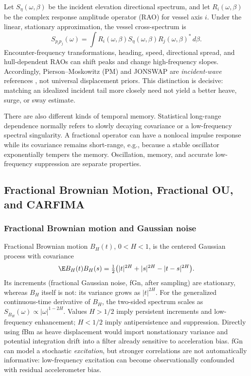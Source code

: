 Let \(S_\eta(\omega,\beta)\) be the incident elevation directional
spectrum, and let \(R_i(\omega,\beta)\) be the complex response amplitude
operator (RAO) for vessel axis \(i\). Under the linear, stationary
approximation, the vessel cross-spectrum is
\begin{equation}
S_{p_i p_j}(\omega)=\int
 R_i(\omega,\beta) S_\eta(\omega,\beta)
 R_j(\omega,\beta)^*\,d\beta.
\label{eq:frac-rao}
\end{equation}
Encounter-frequency transformations, heading, speed, directional spread,
and hull-dependent RAOs can shift peaks and change high-frequency slopes.
Accordingly, Pierson--Moskowitz (PM) and JONSWAP are \emph{incident-wave}
references \cite{pierson64,hasselmann73}, not universal displacement priors.
This distinction is decisive: matching an idealized incident tail more
closely need not yield a better heave, surge, or sway estimate.

There are also different kinds of temporal memory. Statistical
long-range dependence normally refers to slowly decaying covariance or a
low-frequency spectral singularity. A fractional operator can have a
nonlocal impulse response while its covariance remains short-range, e.g.,
because a stable oscillator exponentially tempers the memory. Oscillation,
memory, and accurate low-frequency suppression are separate properties.

\subsection{Fractional Brownian Motion, Fractional OU, and CARFIMA}
\label{sec:frac-processes}
\subsubsection{Fractional Brownian motion and Gaussian noise}
Fractional Brownian motion \(B_H(t)\), \(0<H<1\), is the centered Gaussian
process with covariance \cite{mandelbrot68}
\begin{equation}
\E B_H(t)B_H(s)=\tfrac12\bigl(
 |t|^{2H}+|s|^{2H}-|t-s|^{2H}\bigr).
\label{eq:frac-fbm}
\end{equation}
Its increments (fractional Gaussian noise, fGn, after sampling) are
stationary, whereas \(B_H\) itself is not: its variance grows as
\(|t|^{2H}\). For the generalized continuous-time derivative of \(B_H\),
the two-sided spectrum scales as
\(S_{\dot B_H}(\omega)\propto|\omega|^{1-2H}\).
Values \(H>1/2\) imply persistent increments and low-frequency
enhancement; \(H<1/2\) imply antipersistence and suppression. Directly
using fBm as heave displacement would import nonstationary variance and
potential integration drift into a filter already sensitive to acceleration
bias. fGn can model a stochastic \emph{excitation}, but stronger
correlations are not automatically informative: low-frequency excitation
can become observationally confounded with residual accelerometer bias.

